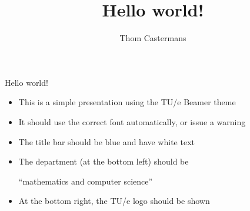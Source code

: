 \documentclass[12pt, aspectratio=169]{beamer} %
\title{Hello world!}
\author{Thom Castermans}
\begin{document}
\begin{frame}{Hello world!}
  \begin{itemize}
    \item This is a simple presentation using the TU/e Beamer theme
    \item It should use the correct font automatically, or issue a warning
    \item The title bar should be blue and have white text
    \item The department (at the bottom left) should be
          
          ``mathematics and computer science''
    \item At the bottom right, the TU/e logo should be shown
  \end{itemize}
\end{frame}
\end{document}
